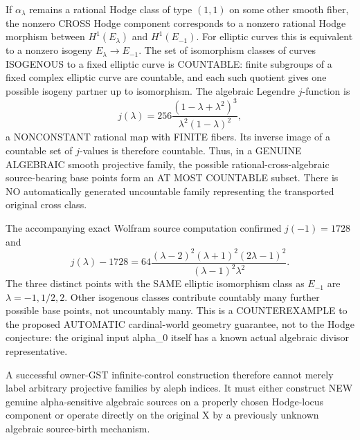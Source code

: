 \documentclass[11pt]{article}
\begin{document}
If $\alpha_\lambda$ remains a rational Hodge class
of type $(1,1)$ on some other smooth fiber,
the nonzero CROSS Hodge component corresponds
to a nonzero rational Hodge morphism between
$H^1(E_\lambda)$ and $H^1(E_{-1})$.
For elliptic curves this is equivalent to a
nonzero isogeny $E_\lambda\to E_{-1}$.
The set of isomorphism classes of curves
ISOGENOUS to a fixed elliptic curve is COUNTABLE:
finite subgroups of a fixed complex elliptic curve
are countable, and each such quotient gives
one possible isogeny partner up to isomorphism.
The algebraic Legendre $j$-function is
\[
j(\lambda)=
256\frac{(1-\lambda+\lambda^2)^3}
{\lambda^2(1-\lambda)^2},
\]
a NONCONSTANT rational map with FINITE fibers.
Its inverse image of a countable set of
$j$-values is therefore countable.
Thus, in a GENUINE ALGEBRAIC smooth projective
family, the possible rational-cross-algebraic
source-bearing base points form an AT MOST
COUNTABLE subset. There is NO automatically
generated uncountable family representing
the transported original cross class.

The accompanying exact Wolfram source computation
confirmed $j(-1)=1728$ and
\[
j(\lambda)-1728=
64\frac{(\lambda-2)^2(\lambda+1)^2
(2\lambda-1)^2}
{(\lambda-1)^2\lambda^2}.
\]
The three distinct points with the SAME
elliptic isomorphism class as $E_{-1}$
are $\lambda=-1,1/2,2$. Other isogenous
classes contribute countably many further
possible base points, not uncountably many.
This is a COUNTEREXAMPLE to the proposed
AUTOMATIC cardinal-world geometry guarantee,
not to the Hodge conjecture: the original
input alpha_0 itself has a known actual
algebraic divisor representative.

A successful owner-GST infinite-control
construction therefore cannot merely label
arbitrary projective families by aleph indices.
It must either construct NEW genuine
alpha-sensitive algebraic sources on a
properly chosen Hodge-locus component or
operate directly on the original X by a
previously unknown algebraic source-birth
mechanism.
\end{document}
